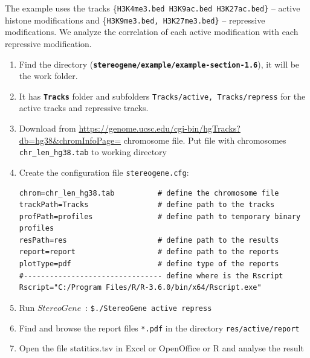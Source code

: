 \documentclass{article}
\newcommand{\prm}[1]{\texttt{\textbf{{#1}}}}
\newcommand{\pr}[1]{\texttt{{#1}}}
\newcommand{\sg}{$StereoGene$\ }
\begin{document}
The example uses the tracks \{\pr{H3K4me3.bed H3K9ac.bed H3K27ac.bed\}} -- active histone modifications and \{\pr{H3K9me3.bed, H3K27me3.bed\}} -- repressive modifications. We analyze the correlation of each active modification with each repressive modification.
\begin{enumerate}
\item Find the directory (\prm{stereogene/example/example-section-1.6}), it will be the work folder.
\item It has \prm{Tracks} folder and subfolders \pr{Tracks/active, Tracks/repress} for the active tracks and repressive tracks.
\item Download from \url{https://genome.ucsc.edu/cgi-bin/hgTracks?db=hg38&chromInfoPage=} chromosome file. Put file with chromosomes \pr{chr\_len\_hg38.tab} to working directory
\item Create the configuration file \pr{stereogene.cfg}:

\begin{shaded} 
\begin{verbatim}
chrom=chr_len_hg38.tab          # define the chromosome file
trackPath=Tracks                # define path to the tracks
profPath=profiles               # define path to temporary binary profiles
resPath=res                     # define path to the results
report=report                   # define path to the reports
plotType=pdf                    # define type of the reports
#-------------------------------- define where is the Rscript 
Rscript="C:/Program Files/R/R-3.6.0/bin/x64/Rscript.exe"
\end{verbatim}
\end{shaded}


\item Run \sg: 
\pr{\$./StereoGene active repress}
\item Find and browse the report files \pr{*.pdf} in the directory \pr{res/active/report}
\item Open the file statitics.tsv in Excel or OpenOffice or R and analyse the result
\end{enumerate}
\end{document}
